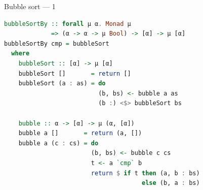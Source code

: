 \documentclass[handout]{beamer}
\begin{document}
\begin{frame}[fragile]{Bubble sort --- 1}

\begin{lstlisting}[language=Haskell]
bubbleSortBy :: forall μ α. Monad μ
             => (α -> α -> μ Bool) -> [α] -> μ [α]
bubbleSortBy cmp = bubbleSort
  where
    bubbleSort :: [α] -> μ [α]
    bubbleSort []       = return []
    bubbleSort (a : as) = do
                          (b, bs) <- bubble a as
                          (b :) <$> bubbleSort bs

    bubble :: α -> [α] -> μ (α, [α])
    bubble a []       = return (a, [])
    bubble a (c : cs) = do
                        (b, bs) <- bubble c cs
                        t <- a `cmp` b
                        return $ if t then (a, b : bs)
                                      else (b, a : bs)
\end{lstlisting}

\end{frame}
\end{document}
